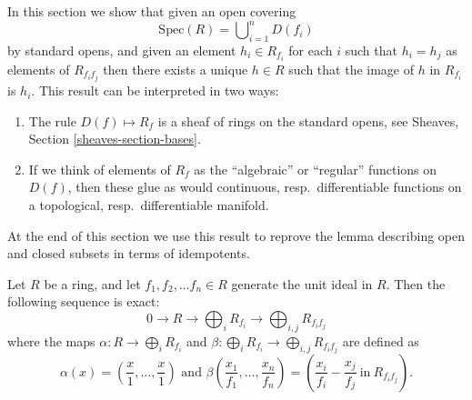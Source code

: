 \noindent
In this section we show that given an open covering
$$
\text{Spec}(R) = \bigcup\nolimits_{i = 1}^n D(f_i)
$$
by standard opens, and given an element $h_i \in R_{f_i}$
for each $i$ such that $h_i = h_j$ as elements of $R_{f_i f_j}$
then there exists a unique $h \in R$ such that the image of
$h$ in $R_{f_i}$ is $h_i$. This result can be interpreted
in two ways:
\begin{enumerate}
\item The rule $D(f) \mapsto R_f$ is a sheaf of rings
on the standard opens, see Sheaves, Section \ref{sheaves-section-bases}.
\item If we think of elements of $R_f$ as the ``algebraic''
or ``regular'' functions on $D(f)$, then these glue
as would continuous, resp.\ differentiable functions
on a topological, resp.\ differentiable manifold.
\end{enumerate}
At the end of this section we use this result to reprove the
lemma describing open and closed subsets in terms of
idempotents.

\begin{lemma}
\label{lemma-standard-covering}
Let $R$ be a ring, and let $f_1, f_2, \ldots f_n\in R$ generate
the unit ideal in $R$.
Then the following sequence is exact:
\[
0 \longrightarrow
R \longrightarrow
\bigoplus\nolimits_i R_{f_i} \longrightarrow
\bigoplus\nolimits_{i,j}R_{f_if_j}
\]
where the maps $\alpha : R \longrightarrow \bigoplus_i R_{f_i}$
and $\beta : \bigoplus_i R_{f_i} \longrightarrow \bigoplus_{i,j} R_{f_if_j}$
are defined as
$$
\alpha(x) = \left(\frac{x}{1}, \ldots, \frac{x}{1}\right)
\text{ and }
\beta\left(\frac{x_1}{f_1},\ldots,\frac{x_n}{f_n}\right)
=
\left(\frac{x_i}{f_i}-\frac{x_j}{f_j}~\text{in}~R_{f_if_j}\right).
$$
\end{lemma}

